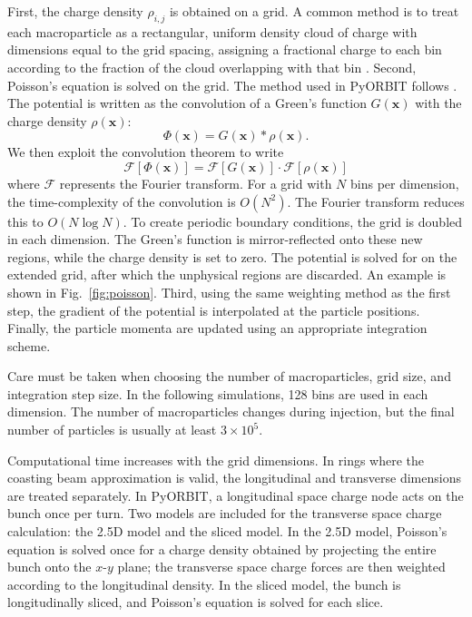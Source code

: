 First, the charge density $\rho_{i,j}$ is obtained on a grid. A common method is to treat each macroparticle as a rectangular, uniform density cloud of charge with dimensions equal to the grid spacing, assigning a fractional charge to each bin according to the fraction of the cloud overlapping with that bin \cite{Birdsall1975}. Second, Poisson’s equation is solved on the grid. The method used in PyORBIT follows \cite{Hockney1981}. The potential is written as the convolution of a Green's function $G(\mathbf{x})$ with the charge density $\rho(\mathbf{x})$:
%
\begin{equation}
    \Phi(\mathbf{x}) = G(\mathbf{x}) * \rho(\mathbf{x}).
\end{equation}
%
We then exploit the convolution theorem \cite{Arfken1985} to write
%
\begin{equation}
    \mathcal{F}[\Phi(\mathbf{x})]
    =
    \mathcal{F}[G(\mathbf{x})] \cdot \mathcal{F}[\rho(\mathbf{x})]
\end{equation}
%
where $\mathcal{F}$ represents the Fourier transform. For a grid with $N$ bins per dimension, the time-complexity of the convolution is $O(N^2)$. The Fourier transform reduces this to $O(N \log N)$. To create periodic boundary conditions, the grid is doubled in each dimension. The Green's function is mirror-reflected onto these new regions, while the charge density is set to zero. The potential is solved for on the extended grid, after which the unphysical regions are discarded. An example is shown in Fig.~\ref{fig:poisson}. Third, using the same weighting method as the first step, the gradient of the potential is interpolated at the particle positions. Finally, the particle momenta are updated using an appropriate integration scheme.

Care must be taken when choosing the number of macroparticles, grid size, and integration step size. In the following simulations, 128 bins are used in each dimension. The number of macroparticles changes during injection, but the final number of particles is usually at least $3 \times 10^{5}$.

Computational time increases with the grid dimensions. In rings where the coasting beam approximation is valid, the longitudinal and transverse dimensions are treated separately. In PyORBIT, a longitudinal space charge node acts on the bunch once per turn. Two models are included for the transverse space charge calculation: the 2.5D model and the sliced model. In the 2.5D model, Poisson’s equation is solved once for a charge density obtained by projecting the entire bunch onto the $x$-$y$ plane; the transverse space charge forces are then weighted according to the longitudinal density. In the sliced model, the bunch is longitudinally sliced, and Poisson’s equation is solved for each slice. 


